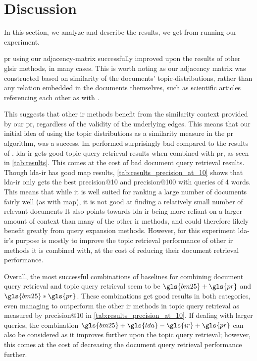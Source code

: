\section{Discussion}\label{sec:discussion}
In this section, we analyze and describe the results, we get from running our experiment.

\gls{pr} using our adjacency-matrix successfully improved upon the results of other gls{ir} methods, in many cases.
This is worth noting as our adjacency matrix was constructed based on similarity of the documents' topic-distributions, rather than any relation embedded in the documents themselves, such as scientific articles referencing each other as with \citet{yang2009topic}.

This suggests that other \gls{ir} methods benefit from the similarity context provided by our \gls{pr}, regardless of the validity of the underlying edges.
This means that our initial idea of using the topic distributions as a similarity measure in the \gls{pr} algorithm, was a success.
\gls{lm} performed surprisingly bad compared to the results of \citet{yang2009topic}. 
\gls{lda}-\gls{ir} gets good topic query retrieval results when combined with \gls{pr}, as seen in \autoref{tab:results}.
This comes at the cost of bad document query retrieval results.
Though \gls{lda}-\gls{ir} has good \gls{map} results, \autoref{tab:results_precision_at_10} shows that \gls{lda}-\gls{ir} only gets the best precision@10 and precision@100 with queries of 4 words.
This means that while it is well suited for ranking a large number of documents fairly well (as with \gls{map}), it is not good at finding a relatively small number of relevant documents
It also points towards \gls{lda}-\gls{ir} being more reliant on a larger amount of context than many of the other \gls{ir} methods, and could therefore likely benefit greatly from query expansion methods.
However, for this experiment \gls{lda}-\gls{ir}'s purpose is mostly to improve the topic retrieval performance of other \gls{ir} methods it is combined with, at the cost of reducing their document retrieval performance.

Overall, the most successful combinations of baselines for combining document query retrieval and topic query retrieval seem to be $\gls{bm25}+\gls{pr}$ and $\gls{bm25}*\gls{pr}$.
These combinations get good results in both categories, even managing to outperform the other \gls{ir} methods in topic query retrieval as measured by precision@10 in \autoref{tab:results_precision_at_10}.
If dealing with larger queries, the combination $\gls{bm25}+\gls{lda}-\gls{ir}+\gls{pr}$ can also be considered as it improves further upon the topic query retrieval; however, this comes at the cost of decreasing the document query retrieval performance further.
